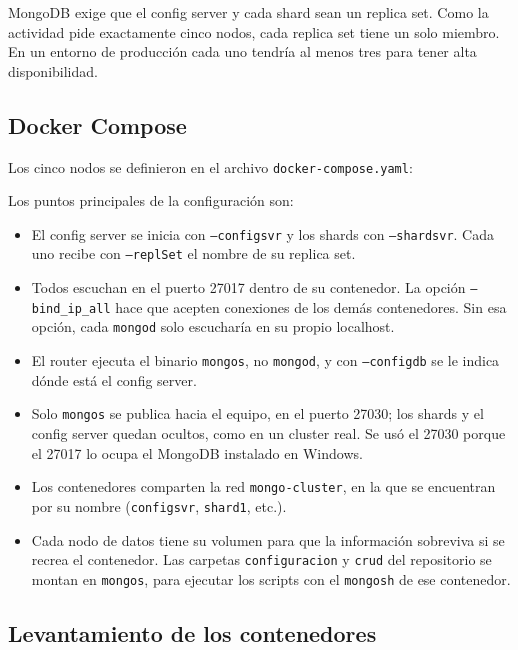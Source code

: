 \documentclass[12pt]{article}
\begin{document}
MongoDB exige que el config server y cada shard sean un replica set. Como la actividad pide exactamente cinco nodos, cada replica set tiene un solo miembro. En un entorno de producción cada uno tendría al menos tres para tener alta disponibilidad.

\subsection{Docker Compose}

Los cinco nodos se definieron en el archivo \texttt{docker-compose.yaml}:



Los puntos principales de la configuración son:

\begin{itemize}[itemsep=2pt, topsep=4pt]
    \item El config server se inicia con \texttt{--configsvr} y los shards con \texttt{--shardsvr}. Cada uno recibe con \texttt{--replSet} el nombre de su replica set.
    \item Todos escuchan en el puerto 27017 dentro de su contenedor. La opción \texttt{--bind\_ip\_all} hace que acepten conexiones de los demás contenedores. Sin esa opción, cada \texttt{mongod} solo escucharía en su propio localhost.
    \item El router ejecuta el binario \texttt{mongos}, no \texttt{mongod}, y con \texttt{--configdb} se le indica dónde está el config server.
    \item Solo \texttt{mongos} se publica hacia el equipo, en el puerto 27030; los shards y el config server quedan ocultos, como en un cluster real. Se usó el 27030 porque el 27017 lo ocupa el MongoDB instalado en Windows.
    \item Los contenedores comparten la red \texttt{mongo-cluster}, en la que se encuentran por su nombre (\texttt{configsvr}, \texttt{shard1}, etc.).
    \item Cada nodo de datos tiene su volumen para que la información sobreviva si se recrea el contenedor. Las carpetas \texttt{configuracion} y \texttt{crud} del repositorio se montan en \texttt{mongos}, para ejecutar los scripts con el \texttt{mongosh} de ese contenedor.
\end{itemize}

\subsection{Levantamiento de los contenedores}
\end{document}

